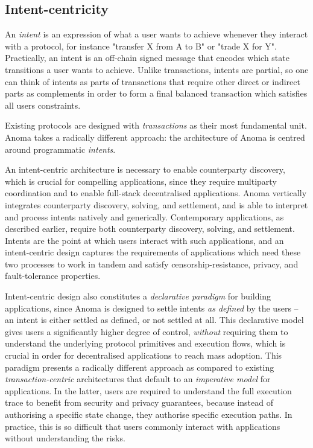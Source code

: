 \subsection{Intent-centricity}\label{intent-centricity}

An \emph{intent} is an expression of what a user wants to achieve
whenever they interact with a protocol, for instance "transfer X from A
to B" or "trade X for Y". Practically, an intent is an off-chain signed
message that encodes which state transitions a user wants to achieve.
Unlike transactions, intents are partial, so one can think of intents as
parts of transactions that require other direct or indirect parts as
complements in order to form a final balanced transaction which
satisfies all users\textquotesingle{} constraints.

Existing protocols are designed with \emph{transactions} as their most
fundamental unit. Anoma takes a radically different approach: the
architecture of Anoma is centred around programmatic \emph{intents}.

An intent-centric architecture is necessary to enable counterparty
discovery, which is crucial for compelling applications, since they
require multiparty coordination and to enable full-stack decentralised
applications. Anoma vertically integrates counterparty discovery,
solving, and settlement, and is able to interpret and process intents
natively and generically. Contemporary applications, as described
earlier, require both counterparty discovery, solving, and settlement.
Intents are the point at which users interact with such applications,
and an intent-centric design captures the requirements of applications
which need these two processes to work in tandem and satisfy
censorship-resistance, privacy, and fault-tolerance properties.

Intent-centric design also constitutes a \emph{declarative paradigm} for
building applications, since Anoma is designed to settle intents
\emph{as defined} by the users -- an intent is either settled as
defined, or not settled at all. This declarative model gives users a
significantly higher degree of control, \emph{without} requiring them to
understand the underlying protocol primitives and execution flows, which
is crucial in order for decentralised applications to reach mass
adoption. This paradigm presents a radically different approach as
compared to existing \emph{transaction-centric} architectures that
default to an \emph{imperative model} for applications. In the latter,
users are required to understand the full execution trace to benefit
from security and privacy guarantees, because instead of authorising a
specific state change, they authorise specific execution paths. In
practice, this is so difficult that users commonly interact with
applications without understanding the risks.

